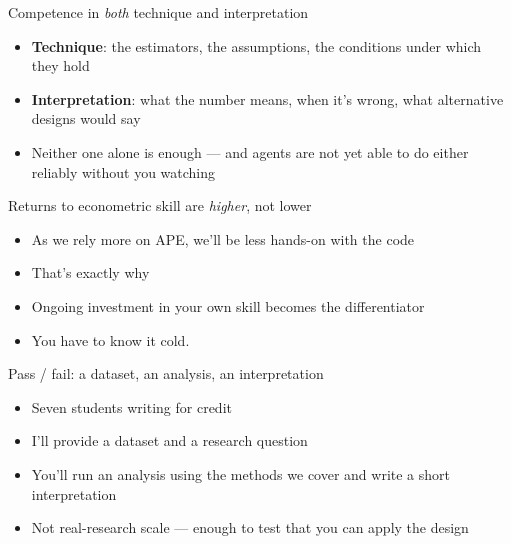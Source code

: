 \documentclass[aspectratio=169,11pt]{beamer}
\begin{document}
\begin{frame}{Competence in \textit{both} technique and interpretation}
\vspace{0.5em}
\begin{itemize}
  \item \textbf{Technique}: the estimators, the assumptions, the conditions under which they hold
  \item \textbf{Interpretation}: what the number means, when it's wrong, what alternative designs would say
  \item Neither one alone is enough --- and agents are not yet able to do either reliably without you watching
\end{itemize}
\end{frame}

\begin{frame}{Returns to econometric skill are \textit{higher}, not lower}
\vspace{0.4em}
\begin{itemize}
  \item As we rely more on APE, we'll be less hands-on with the code
  \item That's exactly why 
  \item Ongoing investment in your own skill becomes the differentiator
  \item {} You have to know it cold.
\end{itemize}
\end{frame}

\begin{frame}{Pass / fail: a dataset, an analysis, an interpretation}
\vspace{0.5em}
\begin{itemize}
  \item Seven students writing for credit
  \item I'll provide a dataset and a research question
  \item You'll run an analysis using the methods we cover and write a short interpretation
  \item Not real-research scale --- enough to test that you can apply the design
\end{itemize}
\vspace{1em}
\end{frame}
\end{document}
